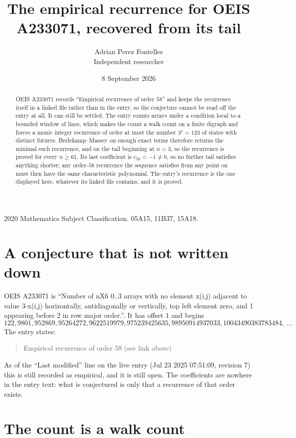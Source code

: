 \documentclass[11pt,a4paper]{article}
\title{The empirical recurrence for OEIS A233071, recovered from its tail}
\author{Adrian Perez Fontelles\\ \small Independent researcher}
\date{8 September 2026}
\theoremstyle{plain}
\theoremstyle{definition}
\begin{document}
\maketitle

\begin{abstract}
OEIS A233071 records ``Empirical recurrence of order $58$'' and keeps the recurrence itself in
a linked file rather than in the entry, so the conjecture cannot be read off the entry at all.
It can still be settled. The entry counts arrays under a condition local to a bounded window of
lines, which makes the count a walk count on a finite digraph and forces a monic integer
recurrence of order at most the number $S'=123$ of states with distinct futures. Berlekamp--Massey on
enough exact terms therefore returns the minimal such recurrence, and on the tail beginning at $n=3$, so the recurrence is proved for every $n\ge61$.
Its last coefficient is $c_{58}=-1\neq0$, so no further tail satisfies anything
shorter; any order-$58$ recurrence the sequence satisfies from any point on must then have
the same characteristic polynomial. The entry's recurrence is the one displayed here, whatever
its linked file contains, and it is proved.
\end{abstract}

\noindent\small 2020 Mathematics Subject Classification. 05A15, 11B37, 15A18.\normalsize

\section{A conjecture that is not written down}

OEIS A233071 is ``Number of nX6 0..3 arrays with no element x(i,j) adjacent to value 3-x(i,j) horizontally, antidiagonally or vertically, top left element zero, and 1 appearing before 2 in row major order.''. It has offset $1$ and begins
\[
122, 9801, 952869, 95264272, 9622519979, 975239425635, 98950914937033, 10043490383783484,\ \dots
\]
The entry states:
\begin{quote}
Empirical recurrence of order 58 (see link above)
\end{quote}
As of the ``Last modified'' line on the live entry (Jul 23 2025 07:51:09, revision 7)
this is still recorded as empirical, and it is still open. The coefficients are nowhere in the
entry text: what is conjectured is only that a recurrence of that order exists.

\section{The count is a walk count}
\end{document}
